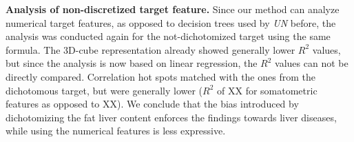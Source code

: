 \documentclass[journal]{style/vgtc} 			          %
\newcommand{\com}[1]{\textcolor{orange}{\uline{#1}}}
\begin{document}
%
%
%

\textbf{Analysis of non-discretized target feature.}
Since our method can analyze numerical target features, as opposed to decision trees used by \emph{UN} before, the analysis was conducted again for the not-dichotomized target using the same formula.
The 3D-cube representation already showed generally lower $R^2$ values, but since the analysis is now based on linear regression, the $R^2$ values can not be directly compared.
Correlation hot spots matched with the ones from the dichotomous target, but were generally lower ($R^2$ of XX for somatometric features as opposed to XX).
We conclude that the bias introduced by dichotomizing the fat liver content enforces the findings towards liver diseases, while using the numerical features is less expressive.
\end{document}
